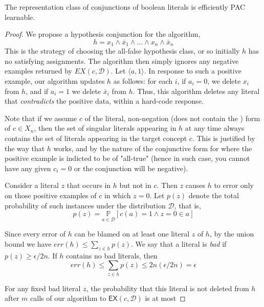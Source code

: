\begin{theorem}
    The representation class of conjunctions of boolean literals is efficiently PAC learnable. 
\end{theorem}
\begin{proof}
    We propose a hypothesis conjunction for the algorithm, 
    \begin{equation}
        h= x_{1} \land \bar{x}_{1} \land \dots \land x_{n} \land \bar{x}_{n}
    \end{equation}
    This is the strategy of choosing the all-false hypothesis class, or so initially $h$ has no satisfying assignments. The algorithm then simply ignores any negative examples returned by $EX(c,\mathcal{D})$. Let $\langle a,1\rangle$. In response to such a positive example, our algorithm updates $h$ as follows: for each $i$, if $a_{i}=0$, we delete $x_{i}$ from $h$, and if $a_{i}=1$ we delete $\bar{x}_{i}$ from $h$. Thus, this algorithm deletes any literal that \textit{contradicts} the positive data, within a hard-code response. 

    Note that if we assume $c$ of the literal, non-negation (does not contain the ) form of $c\in X_{n}$, then the set of singular literals appearing in $h$ at any time always contains the set of literals appearing in the target concept $c$. This is justified by the way that $h$ works, and by the nature of the conjunctive form for where the positive example is indicted to be of "all-true" (hence in such case, you cannot have any given $c_{i}=0$ or the conjunction will be negative). 

    Consider a literal $z$ that occurs in $h$ but not in $c$. Then $z$ causes $h$ to error only on those positive examples of $c$ in which $z=0$. Let $p(z)$ denote the total probability of such instances under the distribution $\mathcal{D}$, that is, 
    \begin{equation}
        p(z) = \underset{a\in\mathcal{D}}{\mathbb{P}} [c(a)=1\land z = 0 \in a]
    \end{equation}

    Since every error of $h$ can be blamed on at least one literal $z$ of $h$, by the union bound we have $err(h)\leq \sum_{z\in h}p(z)$. We say that a literal is \textit{bad} if $p(z)\geq \epsilon/2n$. If $h$ contains no bad literals, then \begin{equation}
        err(h) \leq \sum_{z\in h}p(z) \leq 2n(\epsilon/2n) = \epsilon 
    \end{equation}

    For any fixed bad literal $z$, the probability that this literal is not deleted from $h$ after $m$ calls of our algorithm to $\mathsf{EX}(c,\mathcal{D})$ is at most 


\end{proof}
